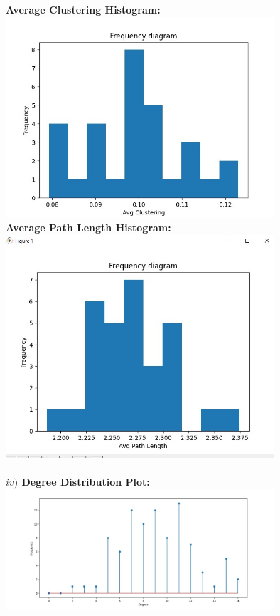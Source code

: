 \documentclass[answers]{exam}
\begin{document}
\begin{questions}
\begin{framed}
\newpage
\textbf{Average Clustering Histogram:}\\\includegraphics[width=10cm]{g2-cc.jpg}\\\textbf{Average Path Length Histogram:}\\\includegraphics[width=10cm]{apl 2.jpg}\\\\\textbf{$iv) $ Degree Distribution Plot:}\\ \includegraphics[width=10cm]{deg dist 2.jpg}\\\\
\newpage

\end{framed}
\end{questions}
\end{document}
